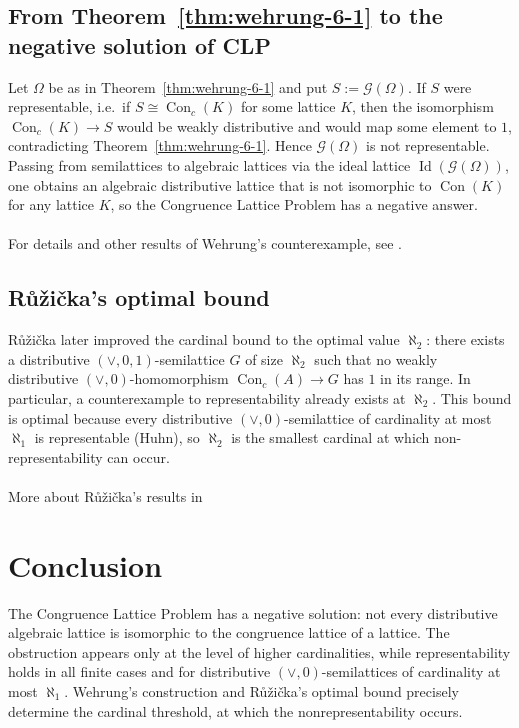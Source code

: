 ﻿\documentclass{article}
\begin{document}
\subsection*{From Theorem~\ref{thm:wehrung-6-1} to the negative solution of CLP}
Let $\Omega$ be as in Theorem~\ref{thm:wehrung-6-1} and put $S:=\mathcal{G}(\Omega)$.
If $S$ were representable, i.e.\ if $S\cong\operatorname{Con}_c(K)$ for some lattice $K$,
then the isomorphism $\operatorname{Con}_c(K)\to S$ would be weakly distributive and would map some element to $1$,
contradicting Theorem~\ref{thm:wehrung-6-1}.
Hence $\mathcal{G}(\Omega)$ is not representable.
Passing from semilattices to algebraic lattices via the ideal lattice $\operatorname{Id}(\mathcal{G}(\Omega))$,
one obtains an algebraic distributive lattice that is not isomorphic to $\operatorname{Con}(K)$ for any lattice $K$,
so the Congruence Lattice Problem has a negative answer.
\\ \\
For details and other results of Wehrung's counterexample, see \cite{Wehrung2007AdvMath}.

\subsection*{R{\r u}{\v z}i{\v c}ka's optimal bound}
R{\r u}{\v z}i{\v c}ka later improved the cardinal bound to the optimal value $\aleph_2$:
there exists a distributive $(\vee,0,1)$-semilattice $G$ of size $\aleph_2$ such that no weakly distributive
$(\vee,0)$-homomorphism $\operatorname{Con}_c(A)\to G$ has $1$ in its range.
In particular, a counterexample to representability already exists at $\aleph_2$.
This bound is optimal because every distributive $(\vee,0)$-semilattice
of cardinality at most $\aleph_1$ is representable (Huhn),
so $\aleph_2$ is the smallest cardinal at which non-representability can occur. 
\\ \\ More about R{\r u}{\v z}i{\v c}ka's results in \cite{Ruzicka2008FreeTrees}


\section{Conclusion}

The Congruence Lattice Problem has a negative solution:
not every distributive algebraic lattice is isomorphic to the congruence
lattice of a lattice.
The obstruction appears only at the level of higher cardinalities,
while representability holds in all finite cases and for distributive
$(\vee,0)$-semilattices of cardinality at most $\aleph_1$.
Wehrung's construction and R{\r u}{\v z}i{\v c}ka's optimal bound
precisely determine the cardinal threshold, at which the nonrepresentability occurs.
\end{document}
